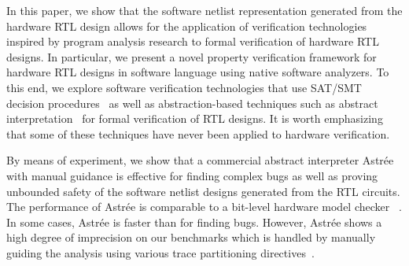 In this paper, we show that the software netlist representation 
generated from the hardware RTL design allows for the application of 
verification technologies inspired by program analysis research to 
formal verification of hardware RTL designs.  
%
In particular, we present a novel property verification framework 
for hardware RTL designs in software language using native 
software analyzers.  To this end, we explore software verification 
technologies that use SAT/SMT decision procedures~\cite{DBLP:conf/cav/BeyerK11,
2ls,cbmc.tacas:2004,DBLP:conf/tacas/HeizmannDGLMSP16} as well as abstraction-based 
techniques such as abstract interpretation~\cite{CC79} for formal verification 
of RTL designs.  It is worth emphasizing that some of these techniques 
have never been applied to hardware verification.  
%


By means of experiment, we show that a commercial abstract interpreter  
Astr{\'e}e with manual guidance is effective for finding complex bugs 
as well as proving unbounded safety of the software netlist designs 
generated from the RTL circuits.  The performance of Astr{\'e}e is 
comparable to a bit-level hardware model checker \ABC~\cite{abc}.  
%
In some cases, Astr{\'e}e is faster than \ABC for finding bugs. 
%
However, Astr{\'e}e shows a high degree of imprecision on our benchmarks 
which is handled by manually guiding the analysis using various trace 
partitioning directives~\cite{DBLP:journals/toplas/RivalM07}.  
%
